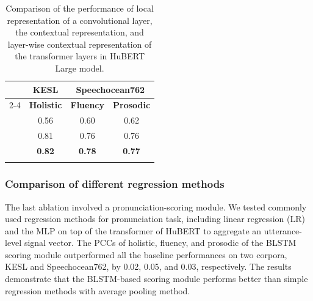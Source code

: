 \documentclass[a4paper]{article}
\begin{document}
\begin{table} [ht]
  \begin{center}
	\begin{tabular}{p{1.5cm}|p{1.0cm}|p{1.0cm}|p{1.0cm}}
	\Xhline{5\arrayrulewidth}
	\multicolumn{1}{c}{{\textbf{\footnotesize Feature}}}&
	\multicolumn{1}{|c}{\textbf{\footnotesize KESL}}&
	\multicolumn{2}{|c}{\textbf{\footnotesize Speechocean762}} \\ \cline{2-4}

	\multicolumn{1}{p{1.5cm}}{ }&
	\multicolumn{1}{|p{1.0cm}}{\centering\textbf{{\footnotesize Holistic}} }&
	\multicolumn{1}{|p{1.0cm}}{\centering\textbf{{\footnotesize Fluency}} }&
	\multicolumn{1}{|p{1.0cm}}{\centering\textbf{{\footnotesize Prosodic}}} \\
	
	\Xhline{3\arrayrulewidth}
	\multicolumn{1}{c}{Local} &
	\multicolumn{1}{|c}{0.56} &
	\multicolumn{1}{|c}{0.60} &
	\multicolumn{1}{|c}{0.62} \\

	\multicolumn{1}{c}{\text{Layer 20}} &
	\multicolumn{1}{|c}{0.81} &
	\multicolumn{1}{|c}{0.76} &
	\multicolumn{1}{|c}{0.76} \\

	\multicolumn{1}{c}{\text{All Layers (Proposed)}} &
	\multicolumn{1}{|c}{\textbf{0.82}} &
	\multicolumn{1}{|c}{\textbf{0.78}} &
	\multicolumn{1}{|c}{\textbf{0.77}} \\

	\Xhline{5\arrayrulewidth}
    \end{tabular}
  \end{center}
  
    \caption{Comparison of the performance of local representation of a convolutional layer, the contextual representation, and layer-wise contextual representation of the transformer layers in HuBERT Large model.}
  
  \label{tab:3}
\end{table}


\subsubsection{Comparison of different regression methods}

The last ablation involved a pronunciation-scoring module. We tested commonly used regression methods for pronunciation task, including linear regression (LR) and the MLP on top of the transformer of HuBERT to aggregate an utterance-level signal vector. The PCCs of holistic, fluency, and prosodic of the BLSTM scoring module outperformed all the baseline performances on two corpora, KESL and Speechocean762, by 0.02, 0.05, and 0.03, respectively. The results demonstrate that the BLSTM-based scoring module performs better than simple regression methods with average pooling method.
\end{document}
